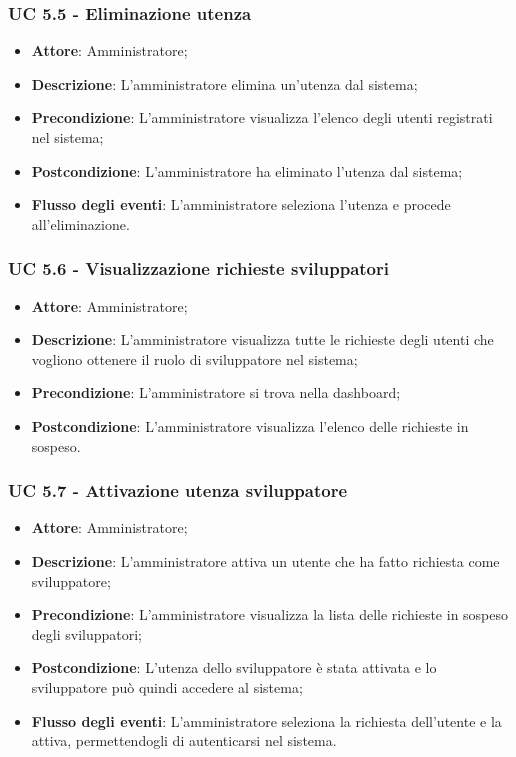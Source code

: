\subsubsection{UC 5.5 - Eliminazione utenza}
\begin{itemize}
\item \textbf{Attore}: Amministratore;
\item \textbf{Descrizione}: L'amministratore elimina un'utenza dal sistema;
\item \textbf{Precondizione}: L'amministratore visualizza l'elenco degli utenti registrati nel sistema;
\item \textbf{Postcondizione}: L'amministratore ha eliminato l'utenza dal sistema;
\item \textbf{Flusso degli eventi}: L'amministratore seleziona l'utenza e procede all'eliminazione.
\end{itemize}


\subsubsection{UC 5.6 - Visualizzazione richieste sviluppatori}
\begin{itemize}
\item \textbf{Attore}: Amministratore;
\item \textbf{Descrizione}: L'amministratore visualizza tutte le richieste degli utenti che vogliono ottenere il ruolo di sviluppatore nel sistema;
\item \textbf{Precondizione}: L'amministratore si trova nella dashboard;
\item \textbf{Postcondizione}: L'amministratore visualizza l'elenco delle richieste in sospeso.
\end{itemize}

\subsubsection{UC 5.7 - Attivazione utenza sviluppatore}
\begin{itemize}
\item \textbf{Attore}: Amministratore;
\item \textbf{Descrizione}: L'amministratore attiva un utente che ha fatto richiesta come sviluppatore;
\item \textbf{Precondizione}: L'amministratore visualizza la lista delle richieste in sospeso degli sviluppatori;
\item \textbf{Postcondizione}: L'utenza dello sviluppatore è stata attivata e lo sviluppatore può quindi accedere al sistema;
\item \textbf{Flusso degli eventi}:  L'amministratore seleziona la richiesta dell'utente e la attiva, permettendogli di autenticarsi nel sistema.
\end{itemize}


